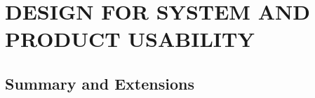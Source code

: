 \chapter{DESIGN FOR SYSTEM AND PRODUCT USABILITY}\label{chap:19}


\section{Summary and Extensions}


\begin{exercises}
    \begin{exercise}
    \label{}
    
    \end{exercise}
    \begin{solution}
    \end{solution}

\end{exercises}